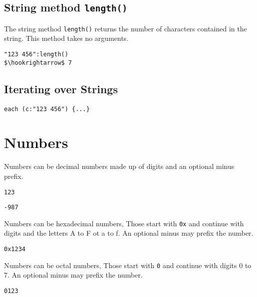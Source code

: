 \documentclass[11pt,a4paper]{scrbook}
\begin{document}
\subsection{String method \texttt{length()}}

The string method \texttt{length()} returns the number of characters contained
in the string. This method takes no arguments.

\begin{lstlisting}[language=BibTool,mathescape=true]
"123 456":length()
$\hookrightarrow$ 7
\end{lstlisting}


\subsection{Iterating over Strings}


\begin{lstlisting}[language=BibTool,mathescape=true]
each (c:"123 456") {...}
\end{lstlisting}

\section{Numbers}

Numbers can be decimal numbers made up of digits and an optional minus prefix.

\begin{lstlisting}[language=BibTool]
123
\end{lstlisting}

\begin{lstlisting}[language=BibTool]
-987
\end{lstlisting}

Numbers can be hexadecimal numbers, Those start with \verb|0x| and continue
with digits and the letters A to F ot a to f. An optional minus may prefix the
number.

\begin{lstlisting}[language=BibTool]
0x1234
\end{lstlisting}

Numbers can be octal numbers, Those start with \verb|0| and continue with
digits 0 to 7. An optional minus may prefix the number.

\begin{lstlisting}[language=BibTool]
0123
\end{lstlisting}
\end{document}
